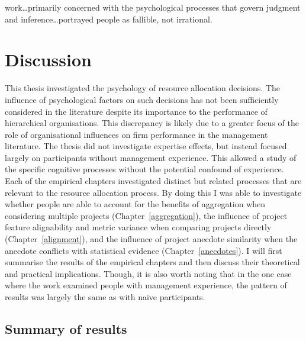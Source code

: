 \documentclass[a4paper, nobind, dvipsnames]{templates/ociamthesis}
\theoremstyle{definition}
\theoremstyle{definition}
\theoremstyle{definition}
\theoremstyle{definition}
\theoremstyle{remark}
\begin{document}
\begin{savequote}
work\ldots primarily concerned with the psychological processes that
govern judgment and inference\ldots portrayed people as fallible, not
irrational.
\end{savequote}

\hypertarget{discussion}{%
\chapter{Discussion}\label{discussion}}

\minitoc

This thesis investigated the psychology of resource allocation decisions. The
influence of psychological factors on such decisions has not been sufficiently
considered in the literature despite its importance to the performance of
hierarchical organisations. This discrepancy is likely due to a greater focus of
the role of organisational influences on firm performance in the management
literature. The thesis did not investigate expertise effects, but instead
focused largely on participants without management experience. This allowed a
study of the specific cognitive processes without the potential confound of
experience. Each of the empirical chapters investigated distinct but related
processes that are relevant to the resource allocation process. By doing this I
was able to investigate whether people are able to account for the benefits of
aggregation when considering multiple projects (Chapter~\ref{aggregation}), the
influence of project feature alignability and metric variance when comparing
projects directly (Chapter~\ref{alignment}), and the influence of project
anecdote similarity when the anecdote conflicts with statistical evidence
(Chapter~\ref{anecdotes}). I will first summarise the results of the empirical
chapters and then discuss their theoretical and practical implications. Though,
it is also worth noting that in the one case where the work examined people with
management experience, the pattern of results was largely the same as with naive
participants.

\section{Summary of results}
\end{document}
